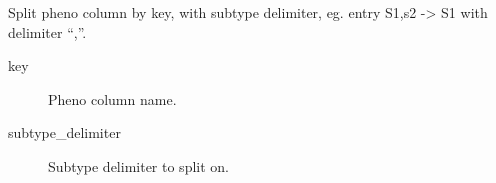\documentclass[letterpaper,10pt,english]{sphinxmanual}
\begin{document}
\begin{fulllineitems}
\begin{fulllineitems}
\begin{description}
\end{description}

\end{fulllineitems}


\begin{fulllineitems}
\label{\detokenize{index:pymethylprocess.PreProcessDataTypes.PreProcessPhenoData.split_key}}
Split pheno column by key, with subtype delimiter, eg. entry S1,s2 -\textgreater{} S1 with delimiter “,”.
\begin{description}
\item[{key}] \leavevmode
Pheno column name.

\item[{subtype\_delimiter}] \leavevmode
Subtype delimiter to split on.

\end{description}

\end{fulllineitems}


\end{fulllineitems}

\end{document}
